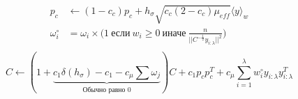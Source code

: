 \begin{algorithm}
{{\begin{equation}
			\begin{aligned}
				p_c &\leftarrow (1- c_c)p_c + h_\sigma\sqrt{c_c(2-c_c)\mu_{eff}}\langle y \rangle_w\\
				\omega_i^\circ & = \omega_i \times \bigg(1 \ \text{если} \ w_i \geq 0 \ \text{иначе} \ \frac{n}{||C^{-\frac{1}{2}}y_{i:\lambda}||^2}\bigg)\\
			\end{aligned}
		\end{equation}
		\begin{equation}
				C \leftarrow (1 + \underbrace{c_1 \delta(h_\sigma) - c_1 - c_\mu\sum \omega_j}_{\text{Обычно равно 0}})C + c_1p_cp_c^T + c_\mu \sum_{i=1}^{\lambda}w_i^\circ y_{i:\lambda}y_{i:\lambda}^T
		\end{equation}
		}		
	}
	\caption{Псевдокод CMA-ES \cite{HansenCmaes}}\label{alg:cmaes-pseudocode}
\end{algorithm} 
